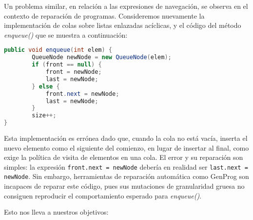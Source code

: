Un problema similar, en relaci\'on a las expresiones de navegaci\'on, se observa en el contexto de reparaci\'on de programas. Consideremos nuevamente la implementaci\'on de colas sobre listas enlazadas ac\'iclicas, y el c\'odigo del m\'etodo \emph{enqueue()} que se muestra a continuaci\'on:
\begin{lstlisting}[frame=tlrb, mathescape=true, language=Java]
public void enqueue(int elem) {
        QueueNode newNode = new QueueNode(elem);
        if (front == null) {
            front = newNode;
            last = newNode;
        } else {
            front.next = newNode;
            last = newNode;
        }
        size++;
}
\end{lstlisting}
Esta implementaci\'on es err\'onea dado que, cuando la cola no est\'a vac\'ia, inserta el nuevo elemento como el siguiente del comienzo, en lugar de insertar al final, como exige la pol\'itica de visita de elementos en una cola. El error y su reparaci\'on son simples: la expresi\'on \texttt{front.next = newNode} deber\'ia en realidad ser \texttt{last.next = newNode}. Sin embargo, herramientas de reparaci\'on autom\'atica como GenProg son incapaces de reparar este c\'odigo, pues sus mutaciones de granularidad gruesa no consiguen reproducir el comportamiento esperado para \emph{enqueue()}. 

Esto nos lleva a nuestros objetivos:

